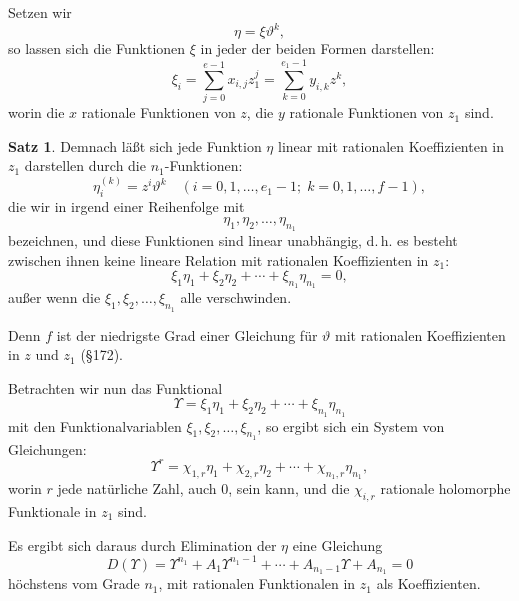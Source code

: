 \documentclass[12pt,a4paper]{article}
\theoremstyle{definition}
\newtheorem{satz}{Satz}[section]
\begin{document}
Setzen wir
\begin{equation}
\eta = \xi\vartheta^k,
\end{equation}
so lassen sich die Funktionen $\xi$ in jeder der beiden Formen darstellen:
\begin{equation}
\xi_i = \sum_{j=0}^{e-1} x_{i,j}z_1^j = \sum_{k=0}^{e_1-1} y_{i,k}z^k,
\end{equation}
worin die $x$ rationale Funktionen von $z$, die $y$ rationale Funktionen von $z_1$ sind.

\begin{satz}
Demnach läßt sich jede Funktion $\eta$ linear mit rationalen Koeffizienten in $z_1$ darstellen durch die $n_1$-Funktionen:
\begin{equation}
\eta_i^{(k)} = z^i\vartheta^k \quad (i = 0, 1, \ldots, e_1-1; \; k = 0, 1, \ldots, f-1),
\end{equation}
die wir in irgend einer Reihenfolge mit
\begin{equation}
\eta_1, \eta_2, \ldots, \eta_{n_1}
\end{equation}
bezeichnen, und diese Funktionen sind linear unabhängig, d.\,h. es besteht zwischen ihnen keine lineare Relation mit rationalen Koeffizienten in $z_1$:
\[\xi_1\eta_1 + \xi_2\eta_2 + \cdots + \xi_{n_1}\eta_{n_1} = 0,\]
außer wenn die $\xi_1, \xi_2, \ldots, \xi_{n_1}$ alle verschwinden.
\end{satz}

Denn $f$ ist der niedrigste Grad einer Gleichung für $\vartheta$ mit rationalen Koeffizienten in $z$ und $z_1$ (\S 172).

Betrachten wir nun das Funktional
\begin{equation}
\Upsilon = \xi_1\eta_1 + \xi_2\eta_2 + \cdots + \xi_{n_1}\eta_{n_1}
\end{equation}
mit den Funktionalvariablen $\xi_1, \xi_2, \ldots, \xi_{n_1}$, so ergibt sich ein System von Gleichungen:
\begin{equation}
\Upsilon^r = \chi_{1,r}\eta_1 + \chi_{2,r}\eta_2 + \cdots + \chi_{n_1,r}\eta_{n_1},
\end{equation}
worin $r$ jede natürliche Zahl, auch $0$, sein kann, und die $\chi_{i,r}$ rationale holomorphe Funktionale in $z_1$ sind.

Es ergibt sich daraus durch Elimination der $\eta$ eine Gleichung
\begin{equation}
D(\Upsilon) = \Upsilon^{n_1} + A_1\Upsilon^{n_1-1} + \cdots + A_{n_1-1}\Upsilon + A_{n_1} = 0
\end{equation}
höchstens vom Grade $n_1$, mit rationalen Funktionalen in $z_1$ als Koeffizienten.
\end{document}
